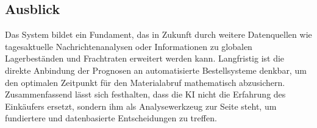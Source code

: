 \subsection{Ausblick}
Das System bildet ein Fundament, das in Zukunft durch weitere Datenquellen wie tagesaktuelle Nachrichtenanalysen oder Informationen zu globalen Lagerbeständen und Frachtraten erweitert werden kann. Langfristig ist die direkte Anbindung der Prognosen an automatisierte Bestellsysteme denkbar, um den optimalen Zeitpunkt für den Materialabruf mathematisch abzusichern. Zusammenfassend lässt sich festhalten, dass die KI nicht die Erfahrung des Einkäufers ersetzt, sondern ihm als Analysewerkzeug zur Seite steht, um fundiertere und datenbasierte Entscheidungen zu treffen.
